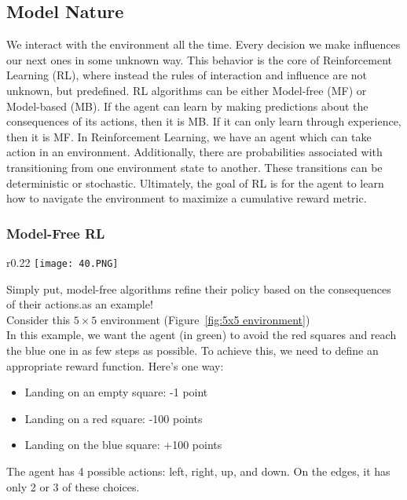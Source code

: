 \subsection{Model Nature}
We interact with the environment all the time. Every decision we make influences our next ones in some unknown way. This behavior is the core of Reinforcement Learning (RL), where instead the rules of interaction and influence are not unknown, but predefined. RL algorithms can be either Model-free (MF) or Model-based (MB). If the agent can learn by making predictions about the consequences of its actions, then it is MB. If it can only learn through experience, then it is MF.
In Reinforcement Learning, we have an agent which can take action in an environment. Additionally, there are probabilities associated with transitioning from one environment state to another. These transitions can be deterministic or stochastic.
Ultimately, the goal of RL is for the agent to learn how to navigate the environment to maximize a cumulative reward metric.

\subsubsection{Model-Free RL}
\begin{wrapfigure}{r}{0.22\textwidth}
    \texttt{[image: 40.PNG]}
  \caption{5x5 environment}
  \label{fig:5x5 environment}
\end{wrapfigure}
Simply put, model-free algorithms refine their policy based on the consequences of their actions.as an example! \\
Consider this $5\times5$ environment (Figure~\ref{fig:5x5 environment})\\
In this example, we want the agent (in green) to avoid the red squares and reach the blue one in as few steps as possible.
To achieve this, we need to define an appropriate reward function. Here's one way:
\begin{itemize}
    \item Landing on an empty square: -1 point
    \item Landing on a red square: -100 points
    \item Landing on the blue square: +100 points
\end{itemize}
The agent has 4 possible actions: left, right, up, and down. On the edges, it has only 2 or 3 of these choices.


